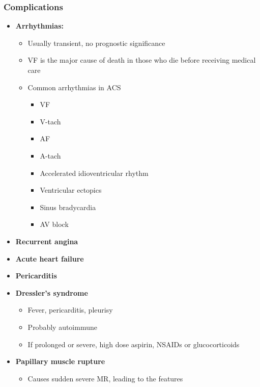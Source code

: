 \documentclass[
  12pt,
]{memoir}
\providecommand{\tightlist}{%
  \setlength{\itemsep}{0pt}\setlength{\parskip}{0pt}}
\begin{document}
\hypertarget{complications}{%
\subsubsection{Complications}\label{complications}}

\begin{itemize}
\tightlist
\item
  \textbf{Arrhythmias:}

  \begin{itemize}
  \tightlist
  \item
    Usually transient, no prognostic significance
  \item
    VF is the major cause of death in those who die before receiving
    medical care
  \item
    Common arrhythmias in ACS

    \begin{itemize}
    \tightlist
    \item
      VF
    \item
      V-tach
    \item
      AF
    \item
      A-tach
    \item
      Accelerated idioventricular rhythm
    \item
      Ventricular ectopics
    \item
      Sinus bradycardia
    \item
      AV block
    \end{itemize}
  \end{itemize}
\item
  \textbf{Recurrent angina}
\item
  \textbf{Acute heart failure}
\item
  \textbf{Pericarditis}
\item
  \textbf{Dressler's syndrome}

  \begin{itemize}
  \tightlist
  \item
    Fever, pericarditis, pleurisy
  \item
    Probably autoimmune
  \item
    If prolonged or severe, high dose aspirin, NSAIDs or glucocorticoids
  \end{itemize}
\item
  \textbf{Papillary muscle rupture}

  \begin{itemize}
  \tightlist
  \item
    Causes sudden severe MR, leading to the features


\end{itemize}
\end{itemize}
\end{document}

